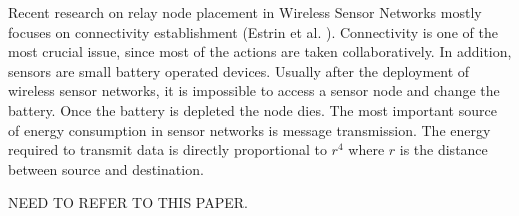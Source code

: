 Recent research on relay node placement in Wireless Sensor Networks mostly focuses on connectivity establishment (Estrin et al. \cite{940390}). Connectivity is one of the most crucial issue, since most of the actions are taken collaboratively. In addition, sensors are small battery operated devices. Usually after the deployment of wireless sensor networks, it is impossible to access a sensor node and change the battery. Once the battery is depleted the node dies. The most important source of energy consumption in sensor networks is message transmission. The energy required to transmit data is directly proportional to $r^4$ where $r$ is the distance between source and destination.

NEED TO REFER TO THIS PAPER\cite{596303}.
\cite{Gao200675}